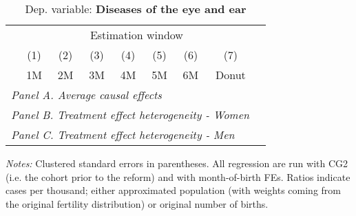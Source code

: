  \begin{table}[H] \begin{threeparttable} \centering \caption{Dep. variable: \textbf{Diseases of the eye and ear}} {\def\sym#1{\ifmmode^{#1}\else\(^{#1}\)\fi} \begin{tabular}{l*{8}{c}} \toprule & \multicolumn{7}{c}{Estimation window} \\ \cmidrule(lr){2-8}
            &\multicolumn{1}{c}{(1)}&\multicolumn{1}{c}{(2)}&\multicolumn{1}{c}{(3)}&\multicolumn{1}{c}{(4)}&\multicolumn{1}{c}{(5)}&\multicolumn{1}{c}{(6)}&\multicolumn{1}{c}{(7)}\\
            &\multicolumn{1}{c}{1M}&\multicolumn{1}{c}{2M}&\multicolumn{1}{c}{3M}&\multicolumn{1}{c}{4M}&\multicolumn{1}{c}{5M}&\multicolumn{1}{c}{6M}&\multicolumn{1}{c}{Donut}\\
\midrule
 \multicolumn{8}{l}{\emph{Panel A. Average causal effects}} \\       \midrule\multicolumn{8}{l}{\emph{Panel B. Treatment effect heterogeneity - Women}} \\       \midrule\multicolumn{8}{l}{\emph{Panel C. Treatment effect heterogeneity - Men}} \\       
\bottomrule \end{tabular} } \begin{tablenotes} \item \scriptsize \emph{Notes:} Clustered standard errors in parentheses. All regression are run with CG2 (i.e. the cohort prior to the reform) and with month-of-birth FEs. Ratios indicate cases per thousand; either approximated population (with weights coming from the original fertility distribution) or original number of births. \end{tablenotes} \end{threeparttable} \end{table} 

